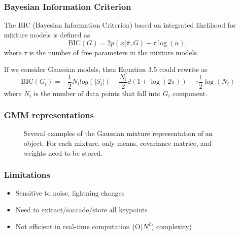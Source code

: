 \documentclass{beamer}
\begin{document}


\begin{frame}
\frametitle{Bayesian Information Criterion}
The BIC (Bayesian Information Criterion) based on integrated likelihood for mixture models is defined as
\begin{equation}
\mathrm{BIC}(G) = 2p(x|\hat{\pi},G)- \tau \log(n),
\end{equation}
where $\tau$ is the number of free parameters in the mixture models.

If we consider Gaussian models, then Equation 3.5 could rewrite as 
\begin{equation}
\mathrm{BIC}(G_{i}) = -\frac{1}{2} N_{i} log(\vert S_{i}\vert) - \frac{N_i}{2} d(1 + \log(2\pi)) - \tau \frac{1}{2} \log(N_{i})
\end{equation}
where $N_i$ is the number of data points that fall into $G_i$ component.

\end{frame}



\begin{frame}
\frametitle{GMM representations}
\begin{figure}
  \centering

  
  \caption{Several examples of the Gaussian mixture representation of an object. For each mixture, only means, covariance matrice, and weights need to be stored.}
  \label{fig:3.3}
\end{figure}   
\end{frame}


\begin{frame}

\frametitle{Limitations}
\begin{itemize}
\item \alert<+>{Sensitive to noise, lightning changes}
\item Need to extract/saccade/store all keypoints
\item Not efficient in real-time computation (O($N^2$) complexity) 
\end{itemize}
\end{frame}
\end{document}

